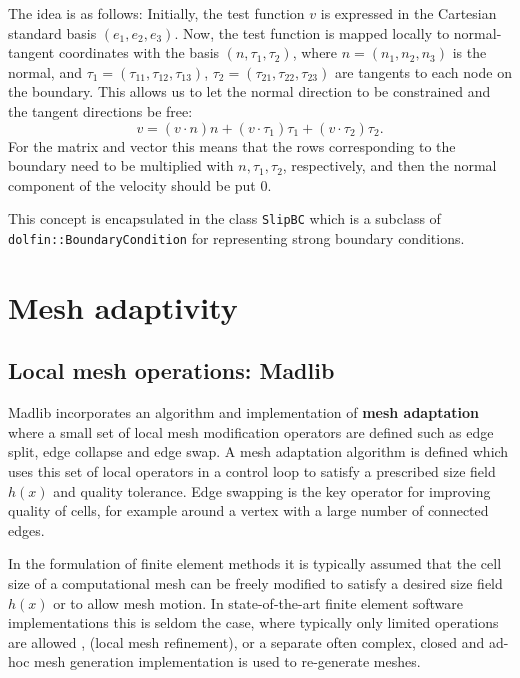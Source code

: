 The idea is as follows: Initially, the test function $v$ is expressed
in the Cartesian standard basis $(e_1, e_2, e_3)$.  Now, the test
function is mapped locally to normal-tangent coordinates with the
basis $(n, \tau_1, \tau_2)$, where $n = (n_1, n_2, n_3)$ is the
normal, and $\tau_1 = (\tau_{11}, \tau_{12}, \tau_{13})$, $\tau_2 =
(\tau_{21}, \tau_{22}, \tau_{23})$ are tangents to each node on the
boundary. This allows us to let the normal direction to be constrained
and the tangent directions be free:
\begin{equation*}
     v = (v \cdot n)n + (v \cdot \tau_1) \tau_1 + (v \cdot \tau_2) \tau_2.
\end{equation*}
For the matrix and vector this means that the rows corresponding to
the boundary need to be multiplied with $n,\tau_1,\tau_2$,
respectively, and then the normal component of the velocity should be
put 0.

This concept is encapsulated in the class {\tt SlipBC} which is a
subclass of \\ {\tt dolfin::BoundaryCondition} for representing strong
boundary conditions.

\section{Mesh adaptivity}

\subsection{Local mesh operations: Madlib}

Madlib incorporates an algorithm and implementation of {\bf mesh
adaptation} where a small set of local mesh modification operators are
defined such as edge split, edge collapse and edge swap. A mesh
adaptation algorithm is defined which uses this set of local operators
in a control loop to satisfy a prescribed size field $h(x)$ and
quality tolerance. Edge swapping is the key operator for improving
quality of cells, for example around a vertex with a large number of
connected edges.

In the formulation of finite element methods it is typically assumed
that the cell size of a computational mesh can be freely modified to
satisfy a desired size field $h(x)$ or to allow mesh motion. In
state-of-the-art finite element software implementations this is
seldom the case, where typically only limited operations are allowed
\cite{BHK07, COMSOL_webpage}, (local mesh refinement),
or a separate often complex, closed and ad-hoc mesh generation
implementation is used to re-generate meshes.

